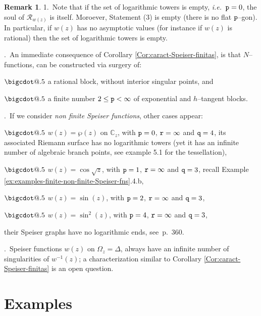 \documentclass[final,3p,times]{elsarticle}
\makeatletter
\newcommand{\CC}{\ensuremath{{\mathbb C}}}
\newcommand{\R}{\ensuremath{{\mathcal R}}}
\newcommand*\bigcdot{\mathpalette\bigcdot@{.5}}
\newcommand*\bigcdot@[2]{\mathbin{\vcenter{\hbox{\scalebox{#2}{$\m@th#1\bullet$}}}}}
\theoremstyle{definition}
\newtheorem{remark}[theorem]{Remark}
\makeatother
\begin{document}
\begin{remark}
1.\ Note that if the set of logarithmic towers is empty,
\emph{i.e.}\ ${\tt p}=0$,
the soul of $\R_{w(z)}$ is itself.
Moroever, Statement (3) is empty (there is no flat $\tt p$--gon).
In particular, if $w(z)$ has no asymptotic values (for instance if $w(z)$ is rational) then 
the set of logarithmic towers is empty.

.\
An immediate consequence of Corollary \ref{Cor:caract-Speiser-finitas},
is that $N$--functions, can be constructed via surgery of:

\noindent
$\bigcdot$
a rational block, without interior singular points, and

\noindent
$\bigcdot$
a finite number $2\leq {\tt p} < \infty$ of 
exponential and $h$--tangent blocks.

.\ 
If we consider \emph{non finite Speiser functions},
other cases appear: 

\noindent
$\bigcdot$ 
$w(z)= \wp(z)$ on $\CC_z$, 
with ${\tt p}=0$, ${\tt r}=\infty$ and ${\tt q}=4$,
its associated Riemann surface has no logarithmic towers 
(yet it has an infinite number of 
algebraic branch points, see \cite{AlvarezGutierrezMucino} example 5.1 for the tessellation),

\noindent
$\bigcdot$
$w(z)=\cos\sqrt{z}$,
with ${\tt p}=1$, ${\tt r}=\infty$ and ${\tt q}=3$, 
recall Example \ref{ex:examples-finite-non-finite-Speiser-fns}.4.b,

\noindent
$\bigcdot$ 
$w(z)=\sin(z)$,
with ${\tt p}=2$, ${\tt r}=\infty$ and ${\tt q}=3$, 

\noindent
$\bigcdot$
$w(z)=\sin^2(z)$, 
with ${\tt p}=4$, ${\tt r}=\infty$ and ${\tt q}=3$,

\noindent
their Speiser graphs have no logarithmic ends, 
see  \cite{GoldbergOstrovskii}\,p.~360.

.\  
Speiser functions $w(z)$ on $\Omega_z=\Delta$, always have an
infinite number of singularities of $w^{-1}(z)$; a characterization similar
to Corollary \ref{Cor:caract-Speiser-finitas} is an open question.
\end{remark}




\section{Examples}
\label{sec:examples}
\end{document}
